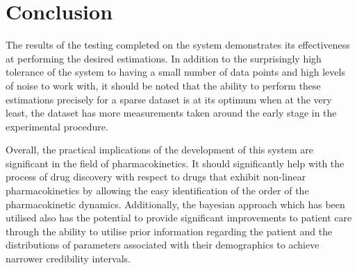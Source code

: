 \section{Conclusion}

The results of the testing completed on the system demonstrates its effectiveness at performing the desired estimations. In addition to the surprisingly high tolerance of the system to having a small number of data points and high levels of noise to work with, it should be noted that the ability to perform these estimations precisely for a sparse dataset is at its optimum when at the very least, the dataset has more measurements taken around the early stage in the experimental procedure.

Overall, the practical implications of the development of this system are significant in the field of pharmacokinetics. It should significantly help with the process of drug discovery with respect to drugs that exhibit non-linear pharmacokinetics by allowing the easy identification of the order of the pharmacokinetic dynamics. Additionally, the bayesian approach which has been utilised also has the potential to provide significant improvements to patient care through the ability to utilise prior information regarding the patient and the distributions of parameters associated with their demographics to achieve narrower credibility intervals.
